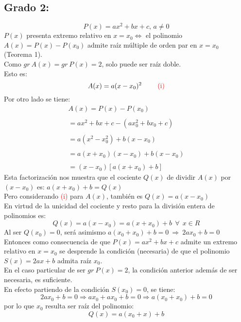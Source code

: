 \documentclass[12pt]{article}
\begin{document}
\subsection*{Grado 2:}
$$
  P(x)=ax^2+bx+c \text{, \ } a\neq0
$$
$P(x)$ presenta extremo relativo en $x={x}_0 \Leftrightarrow $ el polinomio
$A(x)=P(x)-P({x}_0)$ admite raíz múltiple de orden par en $x={x}_0$ (Teorema 1).\\
Como $gr \ A(x) = gr \ P(x) = 2$, solo puede ser raíz doble. \\
Esto es:
$$
  A(x)=a(x-{x}_0)^2 \ \ \ \ \ \ \ \text{\textcolor{red}{(i)}}
$$
Por otro lado se tiene:
$$
  \begin{array}{lll}
    A(x)=P(x)-P({x}_0)              \\
    \\
    =ax^2+bx+c-(a{x}_0^2+b{x}_0+c)  \\
    \\
    =a(x^2-{x}_0^2)+b(x-{x}_0)      \\
    \\
    =a(x+{x}_0)(x-{x}_0)+b(x-{x}_0) \\
    \\
    =(x-{x}_0)[a(x+{x}_0)+b]
  \end{array}
$$
Esta factorización nos muestra que el cociente $Q(x)$ de dividir $A(x)$ por $(x-{x}_0)$ es: $a(x+{x}_0)+b=Q(x)$ \\
Pero considerando \textcolor{red}{(i)} para $A(x)$, también es $Q(x)=a(x-{x}_0)$ \\
En virtud de la unicidad del cociente y resto para la división entera de polinomios es:
$$
  Q(x)=a(x-{x}_0)=a(x+{x}_0)+b \ \ \forall \ \ x \in R
$$
Al ser $Q({x}_0)=0$, será asimismo $a({x}_0+{x}_0)+b=0 \ \Rightarrow \ 2a{x}_0+b=0$ \\
Entonces como consecuencia de que $P(x)=ax^2+bx+c$ admite un extremo relativo en $x={x}_0$ se desprende la condición (necesaria) de que el polinomio $S(x)=2ax+b$ admita raíz ${x}_0$.
\\[50pt]
En el caso particular de ser $gr \ P(x)=2 $, la condición anterior además de ser necesaria, es suficiente. \\
En efecto partiendo de la condición $S({x}_0)=0$, se tiene:
$$
  2a{x}_0+b=0 \Rightarrow a{x}_0+a{x}_0+b=0 \Rightarrow a({x}_0+{x}_0)+b=0
$$
por lo que ${x}_0$ resulta ser raíz del polinomio:
$$
  Q(x)=a({x}_0+x)+b
$$
\end{document}
